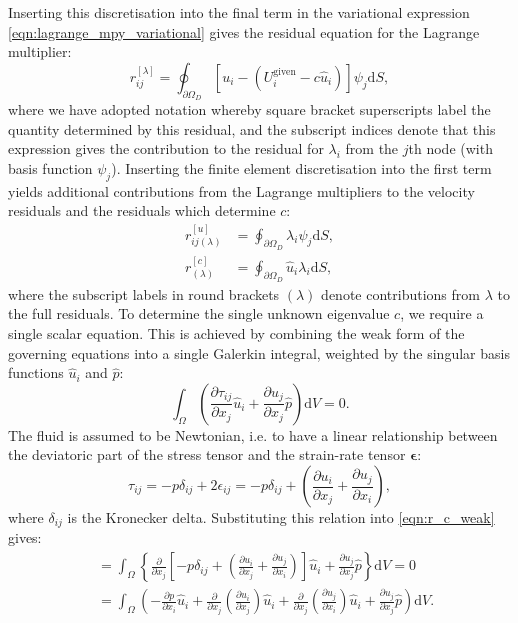 \documentclass[12pt,a4paper]{article}
\numberwithin{equation}{section}
\newcommand{\D}{\mathrm{d}}
\begin{document}
Inserting this discretisation into the final term in the variational expression \eqref{eqn:lagrange_mpy_variational} gives the residual equation for the Lagrange multiplier:
\begin{equation}
  r^{[\lambda]}_{ij} = \oint_{\partial\Omega_D}\left[u_i - (U_i^{\text{given}}-c\hat u_i)\right]\psi_j \D S,
  \label{eqn:residual_lambda}
\end{equation}
where we have adopted notation whereby square bracket superscripts label the quantity determined by this residual, and the subscript indices denote that this expression gives the contribution to the residual for $\lambda_i$ from the $j$th node (with basis function $\psi_j$).
Inserting the finite element discretisation into the first term yields additional contributions from the Lagrange multipliers to the velocity residuals and the residuals which determine $c$:
\begin{align}
  r^{[u]}_{ij(\lambda)} &= \oint_{\partial\Omega_D}\lambda_i\psi_j \D S,
  \label{eqn:lambda_contribution_to_u} \\
  r^{[c]}_{(\lambda)} &= \oint_{\partial\Omega_D}\hat u_i\lambda_i \D S,
                      \label{eqn:lambda_contribution_to_C}
\end{align}
where the subscript labels in round brackets $(\lambda)$ denote contributions from $\lambda$ to the full residuals. To determine the single unknown eigenvalue $c$, we require a single scalar equation. This is achieved by combining the weak form of the governing equations into a single Galerkin integral, weighted by the singular basis functions $\hat u_i$ and $\hat p$:
\begin{equation}
  \int_{\Omega} \left(\frac{\partial \tau_{ij}}{\partial x_j} \hat u_i + \frac{\partial u_j}{\partial x_j}\hat p\right)\D V = 0.
  \label{eqn:r_c_weak}
\end{equation}
The fluid is assumed to be Newtonian, i.e. to have a linear relationship between the deviatoric part of the stress tensor and the strain-rate tensor $\bm\epsilon$:
\begin{equation}
  \tau_{ij} = -p\delta_{ij} + 2\epsilon_{ij} = -p\delta_{ij} + \left(\frac{\partial u_i}{\partial x_j} + \frac{\partial u_j}{\partial x_i}\right),
\end{equation}
where $\delta_{ij}$ is the Kronecker delta. Substituting this relation into \eqref{eqn:r_c_weak} gives:
\begin{align}
  &= \int_{\Omega} \left\{\frac{\partial}{\partial x_j}\left[-p\delta_{ij} + \left(\frac{\partial u_i}{\partial x_j} + \frac{\partial u_j}{\partial x_i}\right) \right] \hat u_i + \frac{\partial u_j}{\partial x_j}\hat p\right\}\D V = 0 \\
      &= \int_{\Omega} \left(-\frac{\partial p}{\partial x_i}\hat u_i + \frac{\partial}{\partial x_j}\left(\frac{\partial u_i}{\partial x_j}\right)\hat u_i + \frac{\partial}{\partial x_j}\left(\frac{\partial u_j}{\partial x_i}\right)\hat u_i + \frac{\partial u_j}{\partial x_j}\hat p \right) \D V.
\end{align}
\end{document}
